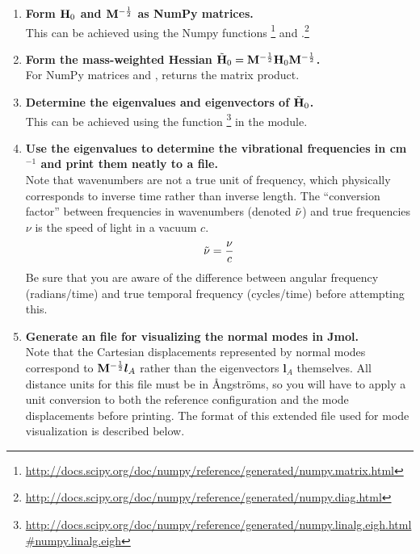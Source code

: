 \documentclass[11pt]{article}
\begin{document}
\begin{enumerate}[label=\textbf{\arabic*}]
\begin{addmargin}{2cm}{}
\end{addmargin}
The square root of a number can be determined either by using the exponential operator in Python ~$=a^b$ or by using the square root function \footnote{\url{http://docs.scipy.org/doc/numpy/reference/generated/numpy.sqrt.html}} provided by the NumPy package.
\item {\bf Form $\mathbf{H}_0$ and $\mathbf{M}^{-\frac{1}{2}}$ as NumPy matrices.}\\
This can be achieved using the Numpy functions  \footnote{\url{http://docs.scipy.org/doc/numpy/reference/generated/numpy.matrix.html}} and .\footnote{\url{http://docs.scipy.org/doc/numpy/reference/generated/numpy.diag.html}}
\item {\bf Form the mass-weighted Hessian $\tilde{\mathbf{H}}_0 = \mathbf{M}^{-\frac{1}{2}}\mathbf{H}_0\mathbf{M}^{-\frac{1}{2}}$.}\\
For NumPy matrices  and ,  returns the matrix product.
\item {\bf Determine the eigenvalues and eigenvectors of $\tilde{\mathbf{H}}_0$.}\\
This can be achieved using the  function \footnote{\url{http://docs.scipy.org/doc/numpy/reference/generated/numpy.linalg.eigh.html\#numpy.linalg.eigh}} in the  module.
\item {\bf Use the eigenvalues to determine the vibrational frequencies in cm$^{-1}$ and print them neatly to a file.}\\
Note that wavenumbers are not a true unit of frequency, which physically corresponds to inverse time rather than inverse length.
The ``conversion factor'' between frequencies in wavenumbers (denoted $\tilde{\nu}$) and true frequencies $\nu$ is the speed of light in a vacuum $c$.
\begin{align*}
	\tilde{\nu} = \dfrac{\nu}{c}
\end{align*}
Be sure that you are aware of the difference between angular frequency (radians/time) and true temporal frequency (cycles/time) before attempting this.
\item {\bf Generate an  file for visualizing the normal modes in Jmol.}\\
\label{last-step}
Note that the Cartesian displacements represented by normal modes correspond to $\mathbf{M}^{-\frac{1}{2}}\bm{l}_A$ rather than the eigenvectors $\bm{l}_A$ themselves.
All distance units for this file must be in \AA ngstr\"oms, so you will have to apply a unit conversion to both the reference configuration and the mode displacements before printing.
The format of this extended  file used for mode visualization is described below.
\end{enumerate}
\end{document}

